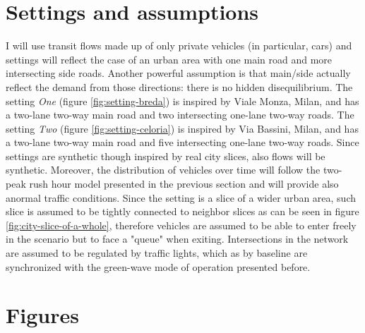 \section{Settings and assumptions}

I will use transit flows made up of only private vehicles (in particular, cars) and settings will reflect the case of an urban area with one main road and more intersecting side roads. Another powerful assumption is that main/side actually reflect the demand from those directions: there is no hidden disequilibrium.
The setting \textit{One} (figure \ref{fig:setting-breda}) is inspired by Viale Monza, Milan, and has a two-lane two-way main road and two intersecting one-lane two-way roads.
The setting \textit{Two} (figure \ref{fig:setting-celoria}) is inspired by Via Bassini, Milan, and has a two-lane two-way main road and five intersecting one-lane two-way roads.
Since settings are synthetic though inspired by real city slices, also flows will be synthetic. Moreover, the distribution of vehicles over time will follow the two-peak rush hour model presented in the previous section and will provide also anormal traffic conditions. Since the setting is a slice of a wider urban area, such slice is assumed to be tightly connected to neighbor slices as can be seen in figure \ref{fig:city-slice-of-a-whole}, therefore vehicles are assumed to be able to enter freely in the scenario but to face a "queue" when exiting. Intersections in the network are assumed to be regulated by traffic lights, which as by baseline are synchronized with the green-wave mode of operation presented before.

\section{Figures}

\putimagecouple
{}
{}

